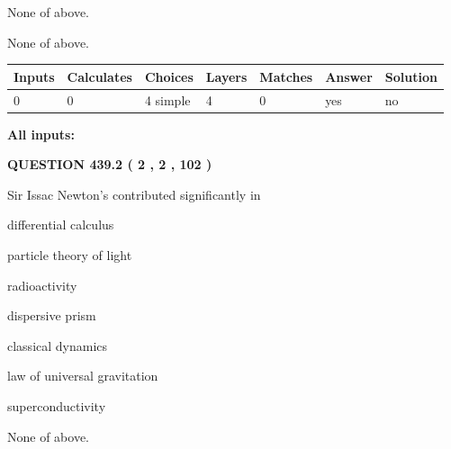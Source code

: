 \documentclass[12pt]{article}
\begin{document}
 
 None of above.
 
 
\noindent{}
 
 
 None of above.
 
 
\noindent{}
 
 
   
   
   
   
\noindent\begin{tabular}{|l|l|l|l|l|l|l|}
 \hline
Inputs & Calculates & Choices & Layers & Matches & Answer & Solution \\ \hline
 0  & 
 0  & 
 4
  simple  
  & 
 4  & 
 0  & 
  yes & 
  no 
  \\ \hline
 \end{tabular}
   
   
   
   
\noindent{}
   
   
   
   
\noindent\vspace{0.1in}\hspace{-0.08in} {\textbf{\Large{All inputs: }}}
   
   
  
\vspace{0.2in}
  
{\textbf{\Large{QUESTION
439.2 
 ( 2 , 2 , 102 )
}}}
  
  
Sir Issac Newton's contributed significantly in
 
 
differential calculus
 
 
particle theory of light
 
 
radioactivity
 
 
dispersive prism
 
 
classical dynamics
 
 
law of universal gravitation
 
 
superconductivity
 
 
 None of above.
 
 
\noindent{}
 
\end{document}
